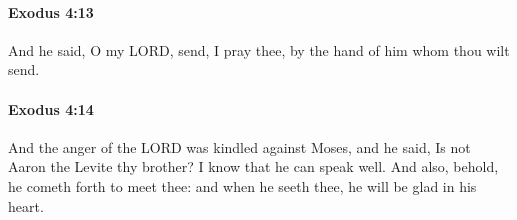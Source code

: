 		\paragraph{Exodus 4:13} %
			\label{EXODUS-4-13}

			And he said, O my LORD, send, I pray thee, by the hand of him whom thou wilt send.


		\paragraph{Exodus 4:14} %
			\label{EXODUS-4-14}

			And the anger of the LORD was kindled against Moses, and he said, Is not Aaron the Levite thy brother? I know that he can speak well. And also, behold, he cometh forth to meet thee: and when he seeth thee, he will be glad in his heart.


